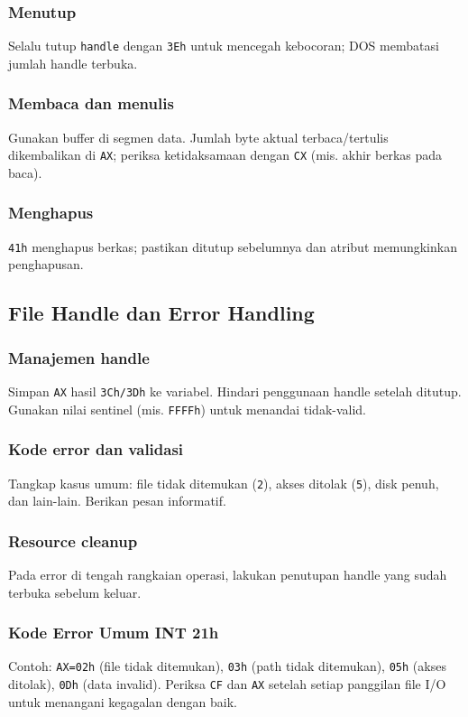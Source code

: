 \subsubsection{Menutup}
Selalu tutup \texttt{handle} dengan \texttt{3Eh} untuk mencegah kebocoran; DOS membatasi jumlah handle terbuka.

\subsubsection{Membaca dan menulis}
Gunakan buffer di segmen data. Jumlah byte aktual terbaca/tertulis dikembalikan di \texttt{AX}; periksa ketidaksamaan dengan \texttt{CX} (mis. akhir berkas pada baca).

\subsubsection{Menghapus}
\texttt{41h} menghapus berkas; pastikan ditutup sebelumnya dan atribut memungkinkan penghapusan.

\subsection{File Handle dan Error Handling}
\subsubsection{Manajemen handle}
Simpan \texttt{AX} hasil \texttt{3Ch/3Dh} ke variabel. Hindari penggunaan handle setelah ditutup. Gunakan nilai sentinel (mis. \texttt{FFFFh}) untuk menandai tidak-valid.

\subsubsection{Kode error dan validasi}
Tangkap kasus umum: file tidak ditemukan (\texttt{2}), akses ditolak (\texttt{5}), disk penuh, dan lain-lain. Berikan pesan informatif.

\subsubsection{Resource cleanup}
Pada error di tengah rangkaian operasi, lakukan penutupan handle yang sudah terbuka sebelum keluar.

\subsubsection{Kode Error Umum INT 21h}
Contoh: \texttt{AX=02h} (file tidak ditemukan), \texttt{03h} (path tidak ditemukan), \texttt{05h} (akses ditolak), \texttt{0Dh} (data invalid). Periksa \texttt{CF} dan \texttt{AX} setelah setiap panggilan file I/O untuk menangani kegagalan dengan baik. \cite{rbil}

